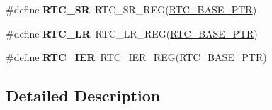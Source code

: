 \begin{DoxyCompactItemize}
\#define {\bfseries R\+T\+C\+\_\+\+SR}~R\+T\+C\+\_\+\+S\+R\+\_\+\+R\+EG(\hyperlink{group___r_t_c___peripheral_ga6455e2b767b4b224b4f00b50e87a2441}{R\+T\+C\+\_\+\+B\+A\+S\+E\+\_\+\+P\+TR})
\item 
\mbox{\label{group___r_t_c___register___accessor___macros_ga05e64891d0c59b705c0f96db04496416}} 
\#define {\bfseries R\+T\+C\+\_\+\+LR}~R\+T\+C\+\_\+\+L\+R\+\_\+\+R\+EG(\hyperlink{group___r_t_c___peripheral_ga6455e2b767b4b224b4f00b50e87a2441}{R\+T\+C\+\_\+\+B\+A\+S\+E\+\_\+\+P\+TR})
\item 
\mbox{\label{group___r_t_c___register___accessor___macros_gad06b6458073a45d15da59f51f95310ab}} 
\#define {\bfseries R\+T\+C\+\_\+\+I\+ER}~R\+T\+C\+\_\+\+I\+E\+R\+\_\+\+R\+EG(\hyperlink{group___r_t_c___peripheral_ga6455e2b767b4b224b4f00b50e87a2441}{R\+T\+C\+\_\+\+B\+A\+S\+E\+\_\+\+P\+TR})
\end{DoxyCompactItemize}


\subsection{Detailed Description}
